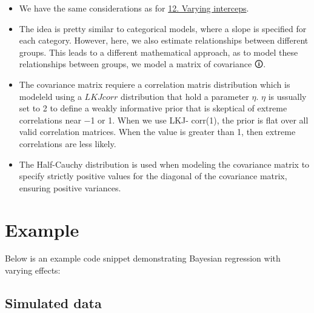 \documentclass[
  letterpaper,
  DIV=11,
  numbers=noendperiod]{scrreprt}
\begin{document}
\begin{tcolorbox}[enhanced jigsaw, toptitle=1mm, opacityback=0, titlerule=0mm, breakable, bottomrule=.15mm, colframe=quarto-callout-caution-color-frame, arc=.35mm, coltitle=black, left=2mm, opacitybacktitle=0.6, leftrule=.75mm, toprule=.15mm, rightrule=.15mm, bottomtitle=1mm, colbacktitle=quarto-callout-caution-color!10!white, title=\textcolor{quarto-callout-caution-color}{\faFire}\hspace{0.5em}{Caution}, colback=white]

\begin{itemize}
\item
  We have the same considerations as for
  \href{12.\%20Varying\%20intercepts.qmd}{12. Varying interceps}.
\item
  The idea is pretty similar to categorical models, where a slope is
  specified for each category. However, here, we also estimate
  relationships between different groups. This leads to a different
  mathematical approach, as to model these relationships between groups,
  we model a \label{cov}{{ matrix of covariance 🛈}}.
\item
  The covariance matrix requiere a correlation matris distribution which
  is modeleld using a \(LKJcorr\) distribution that hold a parameter
  \(η\). \(η\) is ussually set to 2 to define a weakly informative prior
  that is skeptical of extreme correlations near −1 or 1. When we use
  LKJ- corr(1), the prior is flat over all valid correlation matrices.
  When the value is greater than 1, then extreme correlations are less
  likely.
\item
  The Half-Cauchy distribution is used when modeling the covariance
  matrix to specify strictly positive values for the diagonal of the
  covariance matrix, ensuring positive variances.
\end{itemize}

\end{tcolorbox}

\section{Example}\label{example-12}

Below is an example code snippet demonstrating Bayesian regression with
varying effects:

\subsection{Simulated data}\label{simulated-data}
\end{document}
